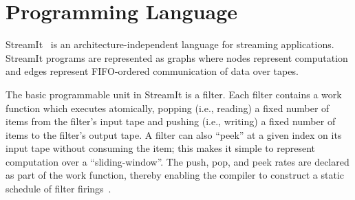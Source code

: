 \documentclass[11pt, letterpaper, onecolumn]{article}
\begin{document}

\section{Programming Language}
\label{sec:pl}

StreamIt~\cite{streamitcc} is an architecture-independent language for
streaming applications.   StreamIt programs are  represented as graphs
where  nodes represent  computation and  edges  represent FIFO-ordered
communication  of data  over tapes.  

The  basic programmable  unit in  StreamIt is  a filter.   Each filter
contains  a work  function which  executes atomically,  popping (i.e.,
reading)  a fixed number  of items  from the  filter's input  tape and
pushing (i.e., writing) a fixed number of items to the filter's output
tape.  A filter  can also ``peek'' at a given index  on its input tape
without  consuming  the  item;  this  makes  it  simple  to  represent
computation over a ``sliding-window''.   The push, pop, and peek rates
are  declared as  part  of  the work  function,  thereby enabling  the
compiler    to    construct    a    static    schedule    of    filter
firings~\cite{lee87static}.


\end{document}
